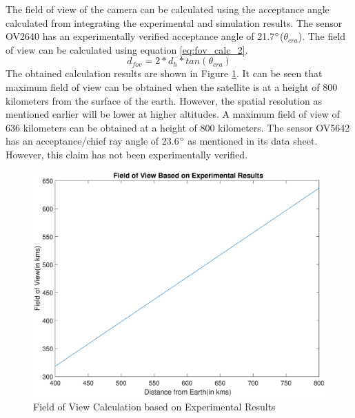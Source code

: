 The field of view of the camera can be calculated using the acceptance angle calculated from integrating the experimental and simulation results. The sensor OV2640 has an experimentally verified acceptance angle of 21.7$\degree$($\theta_{cra}$). The field of view can be calculated using equation \ref{eq:fov_calc_2}. 
\begin{equation}
\label{eq:fov_calc_2}
d_{fov} = 2*d_h*tan(\theta_{cra})
\end{equation}
The obtained calculation results are shown in Figure \ref{fig:fov-graph-1}. It can be seen that maximum field of view can be obtained when the satellite is at a height of 800 kilometers from the surface of the earth. However, the spatial resolution as mentioned earlier will be lower at higher altitudes. A maximum field of view of 636 kilometers can be obtained at a height of 800 kilometers. The sensor OV5642 has an acceptance/chief ray angle of 23.6$\degree$ as mentioned in its data sheet\cite{OV5642DS}. However, this claim has not been experimentally verified.

\begin{figure}[]
\centering
\includegraphics[width = \linewidth]{pics/FOV_Lensless}
\caption{Field of View Calculation based on Experimental Results}
\label{fig:fov-graph-1}
\end{figure}

